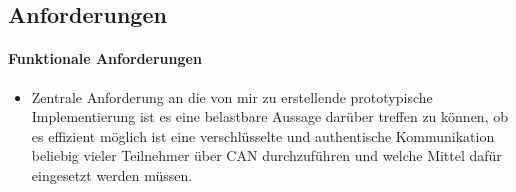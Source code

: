 \subsection{Anforderungen}
\paragraph{Funktionale Anforderungen}
\begin{itemize}
\item[] Zentrale Anforderung an die von mir zu erstellende prototypische Implementierung ist es eine belastbare Aussage darüber treffen zu können, ob es effizient möglich ist eine verschlüsselte und authentische Kommunikation beliebig vieler Teilnehmer über CAN durchzuführen und welche Mittel dafür eingesetzt werden müssen. 
\end{itemize}

